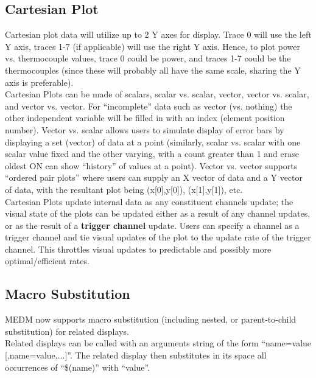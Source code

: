 \subsection{Cartesian Plot}

Cartesian plot data will utilize up to 2 Y axes for
display.  Trace 0 will use the left Y axis, traces 1-7 (if
applicable) will use the right Y axis.  Hence, to plot power
vs. thermocouple values, trace 0 could be power, and traces 1-7
could be the thermocouples (since these will probably all have
the same scale, sharing the Y axis is preferable).\\

\noindent Cartesian Plots can be made of scalars, scalar vs. scalar,
vector, vector vs. scalar, and vector vs. vector.  For ``incomplete''
data such as vector (vs. nothing) the other independent variable
will be filled in with an index (element position number).
Vector vs. scalar allows users to simulate display of error bars
by displaying a set (vector) of data at a point (similarly, scalar
vs. scalar with one scalar value fixed and the other varying, with
a count greater than 1 and erase oldest ON can show ``history'' of
values at a point).  Vector vs. vector supports ``ordered pair plots''
where users can supply an X vector of data and a Y vector of data,
with the resultant plot being (x[0],y[0]), (x[1],y[1]), etc.\\

\noindent Cartesian Plots update internal data as any constituent channels
update;  the visual state of the plots can be updated either as a result
of any channel updates, or as the result of a {\bf trigger channel} update.
Users can specify a channel as a trigger channel and tie visual updates
of the plot to the update rate of the trigger channel.  This throttles
visual updates to predictable and possibly more optimal/efficient rates.\\

\subsection{Macro Substitution} 

MEDM now supports macro substitution (including nested,
or parent-to-child substitution) for related displays.  \\

\noindent Related displays can be called with an arguments string of the form
``name=value [,name=value,...]''.  The related display then substitutes
in its space all occurrences of ``\$(name)'' with ``value''.\\

